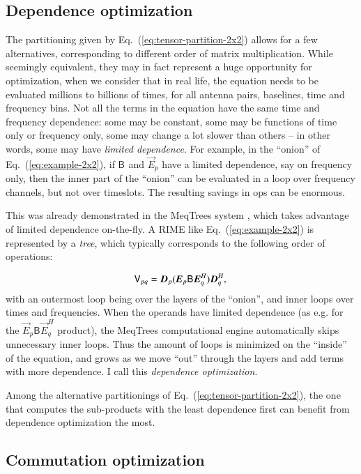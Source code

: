 \documentclass[]{aa}
\newcommand{\herm}{H}
\newcommand{\jones}[2]{\vec {#1}_{#2}}
\newcommand{\jonesT}[2]{\vec {#1}^{\herm}_{#2}}
\newcommand{\coh}[2]{\mathsf{{#1}}_{{#2}}}
\begin{document}
\subsection{Dependence optimization}

The partitioning given by Eq.~(\ref{eq:tensor-partition-2x2}) allows for a few alternatives, corresponding to different order of matrix multiplication. While seemingly equivalent, they may in fact represent a huge opportunity for optimization, when we consider that in real life, 
the equation needs to be evaluated millions to billions of times, for all antenna pairs, baselines, time and frequency bins. Not all the terms in the equation have the same time and frequency dependence: some may be constant, some may be functions of time only or frequency only, some may change a lot slower than others -- in other words, some may have \emph{limited dependence}. For example, in the ``onion'' of Eq.~(\ref{eq:example-2x2}), if $\coh{B}{}$ and $\jones{E}{p}$ have a limited dependence, say on frequency only, then the inner part of the ``onion'' can be evaluated in a loop over frequency channels, but not over timeslots. The resulting savings in ops can be enormous.

This was already demonstrated in the MeqTrees system \citep{meqtrees}, which takes advantage of limited dependence on-the-fly. A RIME like Eq.~(\ref{eq:example-2x2}) is represented by a \emph{tree}, which typically corresponds to the following order of operations:

\[
  \coh{V}{pq} =  \jones{D}{p}(\jones{E}{p} \coh{B}{} \jonesT{E}{q} ) \jonesT{D}{q}, \\
\]
with an outermost loop being over the layers of the ``onion'', and inner loops over times and frequencies. When the operands have limited dependence (as e.g. for the $\jones{E}{p} \coh{B}{} \jonesT{E}{q}$ product), the MeqTrees computational engine automatically skips unnecessary inner loops. Thus the amount of loops is minimized on the ``inside'' of the equation, and grows as we move ``out'' through the layers and add terms with more dependence. I call this \emph{dependence optimization}. 

Among the alternative partitionings of Eq.~(\ref{eq:tensor-partition-2x2}), the one that computes the sub-products with the least dependence first can benefit from dependence optimization the most.

\subsection{Commutation optimization}
\end{document}

